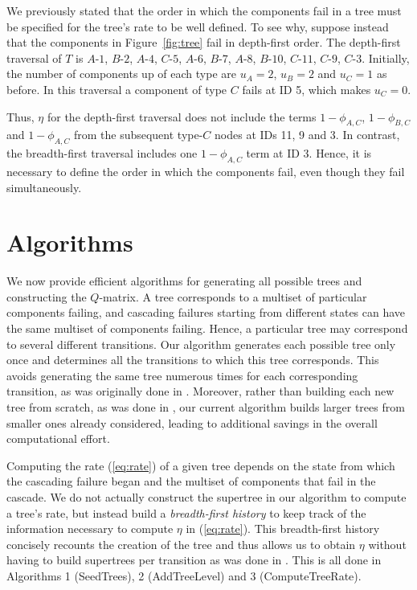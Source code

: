 \documentclass[12pt]{article}
\newcommand{\changed}[1]{#1}
\newcommand{\changed}[1]{\textcolor{red}{#1}}
\newcommand{\varName}[1]{\textrm{\it#1}}
\newcommand{\nodeLabel}[2]{\mbox{$#1$-$#2$}}
\begin{document}
We previously stated that the order in which the components fail in a tree must
be specified for the tree's rate to  be well defined. To see why, suppose
instead that the components in Figure~\ref{fig:tree} fail in depth-first order.
The depth-first traversal of $T$ is \nodeLabel{A}{1}, \nodeLabel{B}{2},
\nodeLabel{A}{4}, \nodeLabel{C}{5}, \nodeLabel{A}{6}, \nodeLabel{B}{7},
\nodeLabel{A}{8}, \nodeLabel{B}{10}, \nodeLabel{C}{11}, \nodeLabel{C}{9},
\nodeLabel{C}{3}. Initially, the number of components up of each type are $u_A =
2$, $u_B = 2$ and $u_C = 1$ as before. In this traversal a component of type $C$
fails at ID 5, which makes $u_C = 0$.

Thus, $\eta$ for the depth-first traversal does not include the terms
$1-\phi_{A,C}$, $1-\phi_{B,C}$ and $1-\phi_{A,C}$ from the subsequent type-$C$
nodes at IDs 11, 9 and 3. In contrast, the breadth-first traversal includes one
$1-\phi_{A,C}$ term at ID 3. Hence, it is necessary to define the order in which
the components fail, even though they fail simultaneously.

\section{Algorithms}
\label{sec:alg}

We now provide efficient algorithms for generating all possible trees and
constructing the $Q$-matrix. A tree corresponds to a multiset of particular
components failing, and cascading failures starting from different states can
have the same multiset of components failing. Hence, a particular tree may
correspond to several different transitions. Our algorithm generates each
possible tree only once and determines all the transitions to which this tree
corresponds. This avoids generating the same tree numerous times for each
corresponding transition, as was originally done in \cite{ING:2009}. Moreover,
rather than building each new tree from scratch, as was done in \cite{ING:2009},
our current algorithm builds larger trees from smaller ones already considered,
leading to additional savings in the overall computational effort.

Computing the rate (\ref{eq:rate}) of a given tree depends on the state from
which the cascading failure began and the multiset of components that fail in
the cascade. We do not actually construct the supertree in our algorithm to
compute a tree's rate, but instead build a \varName{breadth-first history} to
keep track of the information necessary to compute $\eta$ in (\ref{eq:rate}). 
\changed{This breadth-first history concisely recounts the creation of the tree
and thus allows us to obtain $\eta$ without having to build supertrees per
transition as was done in \cite{ING:2009}}. This is all done in Algorithms 1
(SeedTrees), 2 \mbox{(AddTreeLevel)} and 3 (ComputeTreeRate).
\end{document}
